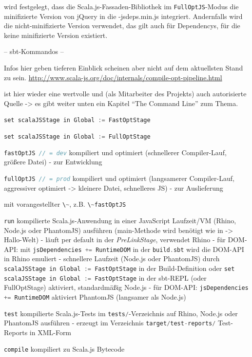 \documentclass[a4paper, 12pt, hidelinks, listof=totoc, listoftables=totoc, bibliography=totoc]{scrreprt}
\newcommand{\code}[1]{\lstinline[language=Scala, style=inline]|#1|}
\begin{document}
wird festgelegt, dass die Scala.js-Fassaden-Bibliothek im \code{FullOptJS}-Modus die minifizierte Version von jQuery in die 
-jsdeps.min.js integriert. Andernfalls
wird die nicht-minifizierte Version verwendet, das gilt auch für Dependencys, für die keine minifizierte Version existiert.








-- sbt-Kommandos --

Infos hier geben tieferen Einblick scheinen aber nicht auf dem aktuellsten Stand zu sein.
\url{http://www.scala-js.org/doc/internals/compile-opt-pipeline.html}

\cite[\#TheCommandLine]{haoyi.HOS} ist hier wieder eine wertvolle und (als Mitarbeiter des Projekts) auch autorisierte Quelle -> es gibt weiter unten ein Kapitel "`The Command Line"' zum Thema.

\code{set scalaJSStage in Global := FastOptStage}

\code{set scalaJSStage in Global := FullOptStage}


\code{fastOptJS // = dev} kompiliert und optimiert (schnellerer Compiler-Lauf, größere Datei) - zur Entwicklung

\code{fullOptJS // = prod} kompiliert und optimiert (langsamerer Compiler-Lauf, aggressiver optimiert -> kleinere Datei, schnelleres JS) - zur Auslieferung

mit vorangestellter  \code{\~}, z.B. \code{\~fastOptJS}

\code{run} kompilierte Scala.js-Anwendung in einer JavaScript Laufzeit/VM (Rhino, Node.js oder PhantomJS) ausführen (main-Methode wird benötigt wie in -> Hallo-Welt)
	- läuft per default in der \emph{PreLinkStage}, verwendet Rhino
		- für \ac{DOM}-\ac{API}: mit \code{jsDependencies += RuntimeDOM} in der \code{build.sbt} wird die DOM-\ac{API} in Rhino emuliert
	- schnellere Laufzeit (Node.js oder PhantomJS) durch \code{scalaJSStage in Global := FastOptStage} in der Build-Definition oder \code{set scalaJSStage in Global := FastOptStage} in der sbt-\ac{REPL} (oder FullOptStage) aktiviert, standardmäßig Node.js
		- für \ac{DOM}-\ac{API}: \code{jsDependencies += RuntimeDOM} aktiviert PhantomJS (langsamer als Node.js)

\code{test} kompilierte Scala.js-Tests im \code{tests/}-Verzeichnis auf Rhino, Node.js oder PhantomJS ausführen
	- erzeugt im Verzeichnis \code{target/test-reports/} Test-Reports in XML-Form

\code{compile} kompiliert zu Scala.js Bytecode
\end{document}
